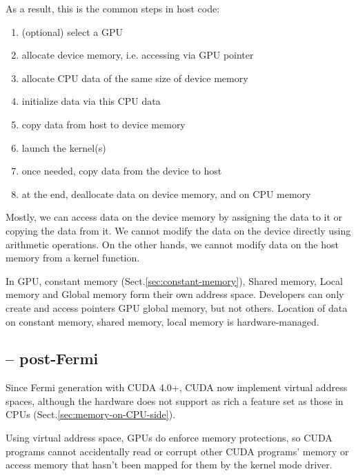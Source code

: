 As a result, this is the common steps in host code: 
\begin{enumerate}

\item (optional) select a GPU

\item allocate device memory, i.e. accessing via GPU pointer

\item allocate CPU data of the same size of device memory

\item initialize data via this CPU data

\item copy data from host to device memory

\item launch the kernel(s)

\item once needed, copy data from the device to host

\item at the end, deallocate data on device memory, and on CPU memory 
\end{enumerate}

Mostly, we can access data on the device memory by assigning the data to it or
copying the data from it. We cannot modify the data on the device directly using
arithmetic operations. On the other hands, we cannot modify data on the host
memory from a kernel function.

In GPU, constant memory (Sect.\ref{sec:constant-memory}), Shared memory, Local
memory and Global memory form their own address space. Developers can only
create and access pointers GPU global memory, but not others. Location of data
on constant memory, shared memory, local memory is hardware-managed.


\subsection{-- post-Fermi}
\label{sec:GPU-pointer-post-Fermi-pre-Kepler}

Since Fermi generation with CUDA 4.0+, CUDA now implement virtual address
spaces, although the hardware does not support as rich a feature set as those in
CPUs (Sect.\ref{sec:memory-on-CPU-side}).

Using virtual address space, GPUs do enforce memory protections, so CUDA
programs cannot accidentally read or corrupt other CUDA programs’ memory or
access memory that hasn’t been mapped for them by the kernel mode driver.

